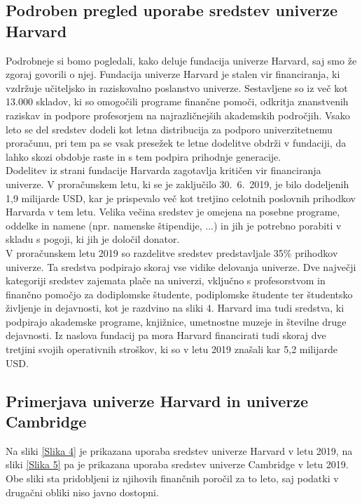 \documentclass[12pt, a4paper]{article}
\begin{document}
\subsection{Podroben pregled uporabe sredstev univerze Harvard}

Podrobneje si bomo pogledali, kako deluje fundacija univerze Harvard, saj smo že zgoraj govorili o njej. Fundacija univerze Harvard je stalen vir financiranja, ki vzdržuje učiteljsko in raziskovalno poslanstvo univerze. Sestavljene so iz več kot 13.000 skladov, ki so omogočili programe finančne pomoči, odkritja znanstvenih raziskav in podpore profesorjem na najrazličnejših akademskih področjih. Vsako leto se del sredstev dodeli kot letna distribucija za podporo univerzitetnemu proračunu, pri tem pa se vsak presežek te letne dodelitve obdrži v fundaciji, da  lahko skozi obdobje raste in s tem podpira prihodnje generacije. \cite{harvard} \\

Dodelitev iz strani fundacije Harvarda zagotavlja kritičen vir financiranja univerze. V proračunskem letu, ki se je zaključilo 30.~6.~2019, je bilo dodeljenih 1,9 milijarde USD, kar je prispevalo več kot tretjino celotnih poslovnih prihodkov Harvarda v tem letu. Velika večina sredstev je omejena na posebne programe, oddelke in namene (npr. namenske štipendije, ...) in jih je potrebno porabiti v skladu s pogoji, ki jih je določil donator. \cite{harvard} \\

V proračunskem letu 2019 so razdelitve sredstev predstavljale 35\% prihodkov univerze. Ta sredstva podpirajo skoraj vse vidike delovanja univerze. Dve največji kategoriji sredstev zajemata plače na univerzi, vključno s profesorstvom in finančno pomočjo za dodiplomske študente, podiplomske študente ter študentsko življenje in dejavnosti, kot je razdvino na sliki 4. Harvard ima tudi sredstva, ki podpirajo akademske programe, knjižnice, umetnostne muzeje in številne druge dejavnosti. Iz naslova fundacij pa mora Harvard financirati tudi skoraj dve tretjini svojih operativnih stroškov, ki so v letu 2019 znašali kar 5,2 milijarde USD. \cite{harvard} 

\subsection{Primerjava univerze Harvard in univerze Cambridge}

Na sliki \ref{Slika 4} je prikazana uporaba sredstev univerze Harvard v letu 2019, na sliki \ref{Slika 5} pa je prikazana uporaba sredstev univerze Cambridge v letu 2019. Obe sliki sta pridobljeni iz njihovih finančnih poročil za to leto, saj podatki v drugačni obliki niso javno dostopni. \\
\end{document}
